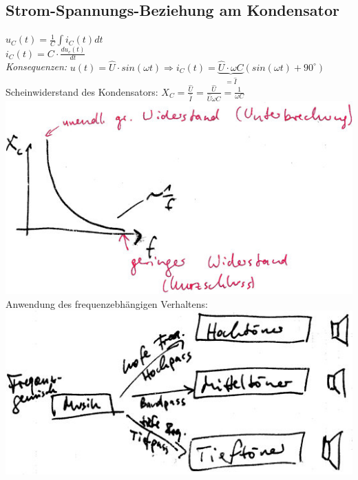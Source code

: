 \subsection{Strom-Spannungs-Beziehung am Kondensator}
$u_C(t)=\frac{1}{C}\int i_C(t) dt$\\
$i_C(t)=C\cdot \frac{du_c(t)}{dt}$\\
\emph{Konsequenzen:} $u(t)=\hat{U}\cdot sin (\omega t) \Rightarrow i_C(t)=\underbrace{\hat{U}\cdot \omega C}_{=\hat{I}}(sin (\omega t) + 90^{\circ})$\\
Scheinwiderstand des Kondensators: $X_C=\frac{\hat{U}}{\hat{I}}=\frac{\hat{U}}{\hat{U}\omega C}=\frac{1}{\omega C}$\\
\includegraphics[scale=.75]{Abbildungen/ABB408}\\
Anwendung des frequenzebhängigen Verhaltens:\\
\includegraphics[scale=.75]{Abbildungen/ABB409}




